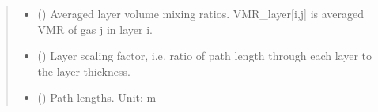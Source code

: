 \documentclass[letterpaper,10pt,english]{sphinxmanual}
\begin{document}
\begin{fulllineitems}
\begin{quote}
\begin{description}
\begin{itemize}
\item {} 
\sphinxAtStartPar
{} () \textendash{} Averaged layer volume mixing ratios.
VMR\_layer{[}i,j{]} is averaged VMR of gas j in layer i.

\item {} 
\sphinxAtStartPar
{} () \textendash{} Layer scaling factor, i.e. ratio of path length through each layer
to the layer thickness.

\item {} 
\sphinxAtStartPar
{} () \textendash{} Path lengths.
Unit: m

\end{itemize}


\end{description}\end{quote}

\end{fulllineitems}

\end{document}
